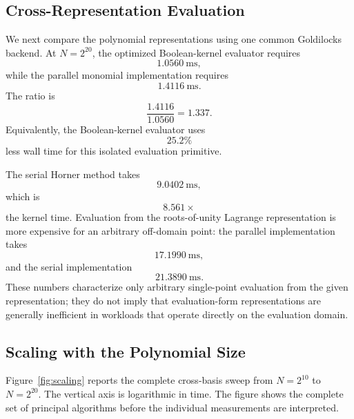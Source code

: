 \subsection{Cross-Representation Evaluation}
\label{sec:cross-representation}

We next compare the polynomial representations using one common Goldilocks
backend.  At \(N=2^{20}\), the optimized Boolean-kernel evaluator requires
\[
1.0560\ \mathrm{ms},
\]
while the parallel monomial implementation requires
\[
1.4116\ \mathrm{ms}.
\]
The ratio is
\[
\frac{1.4116}{1.0560}
=
1.337.
\]
Equivalently, the Boolean-kernel evaluator uses
\[
25.2\%
\]
less wall time for this isolated evaluation primitive.

The serial Horner method takes
\[
9.0402\ \mathrm{ms},
\]
which is
\[
8.561\times
\]
the kernel time.  Evaluation from the roots-of-unity Lagrange
representation is more expensive for an arbitrary off-domain point:
the parallel implementation takes
\[
17.1990\ \mathrm{ms},
\]
and the serial implementation
\[
21.3890\ \mathrm{ms}.
\]
These numbers characterize only arbitrary single-point evaluation from the
given representation; they do not imply that evaluation-form
representations are generally inefficient in workloads that operate
directly on the evaluation domain.

\subsection{Scaling with the Polynomial Size}
\label{sec:scaling}

Figure~\ref{fig:scaling} reports the complete cross-basis sweep from
\(N=2^{10}\) to \(N=2^{20}\).  The vertical axis is logarithmic in time.
The figure shows the complete set of principal algorithms before the
individual measurements are interpreted.

